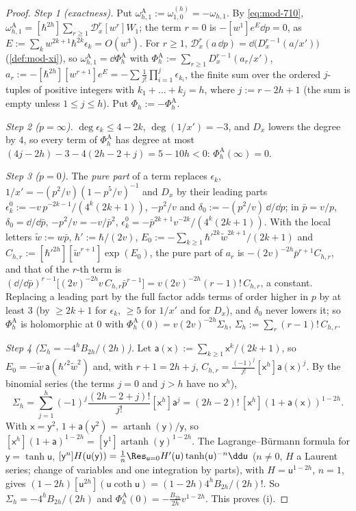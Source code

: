 \begin{proof}
\emph{Step 1 (exactness).} Put $\omega^{\mathrm A}_{h,1}:=\omega^{(h)}_{1,0}=-\omega_{h,1}$. By \eqref{eq:mod-710}, $\omega^{\mathrm A}_{h,1}=[\hbar^{2h}]\sum_{r\geq 1}\mathcal D_x^r[w^r]W_1$; the term $r=0$ is $-[w^1]e^{E}\dd p=0$, as $E:=\sum_kw^{2k+1}\hbar^{2k}\epsilon_k=O(w^3)$. For $r\geq 1$, $\mathcal D_x^r(a\,\dd p)=\dd\big(D_x^{r-1}(a/x')\big)$ (\cref{def:mod-xi}), so $\omega^{\mathrm A}_{h,1}=\dd\Phi^{\mathrm A}_h$ with $\Phi^{\mathrm A}_h:=\sum_{r\geq 1}D_x^{r-1}(a_r/x')$, $a_r:=-[\hbar^{2h}][w^{r+1}]e^{E}=-\sum\frac1{j!}\prod_{i=1}^j\epsilon_{k_i}$, the finite sum over the ordered $j$-tuples of positive integers with $k_1+\dots+k_j=h$, where $j:=r-2h+1$ (the sum is empty unless $1\leq j\leq h$). Put $\Phi_h:=-\Phi^{\mathrm A}_h$.

\emph{Step 2 ($p=\infty$).} $\deg\epsilon_k\leq 4-2k$, $\deg(1/x')=-3$, and $D_x$ lowers the degree by $4$, so every term of $\Phi^{\mathrm A}_h$ has degree at most $(4j-2h)-3-4(2h-2+j)=5-10h<0$: $\Phi^{\mathrm A}_h(\infty)=0$.

\emph{Step 3 ($p=0$).} The \emph{pure part} of a term replaces $\epsilon_k$, $1/x'=-(p^2/v)(1-p^5/v)^{-1}$ and $D_x$ by their leading parts $\epsilon^0_k:=-v\,p^{-2k-1}/(4^k(2k+1))$, $-p^2/v$ and $\delta_0:=-(p^2/v)\,\dd/\dd p$; in $\bar p=v/p$, $\delta_0=\dd/\dd\bar p$, $-p^2/v=-v/\bar p^2$, $\epsilon^0_k=-\bar p^{2k+1}v^{-2k}/(4^k(2k+1))$. With the local letters $\tilde w:=w\bar p$, $\hbar':=\hbar/(2v)$, $E_0:=-\sum_{k\geq 1}\hbar'^{2k}\tilde w^{2k+1}/(2k+1)$ and $C_{h,r}:=[\hbar'^{2h}][\tilde w^{r+1}]\exp(E_0)$, the pure part of $a_r$ is $-(2v)^{-2h}\bar p^{r+1}C_{h,r}$, and that of the $r$-th term is $(\dd/\dd\bar p)^{r-1}\big[(2v)^{-2h}v\,C_{h,r}\bar p^{r-1}\big]=v(2v)^{-2h}(r-1)!\,C_{h,r}$, a constant. Replacing a leading part by the full factor adds terms of order higher in $p$ by at least $3$ (by $\geq 2k+1$ for $\epsilon_k$, $\geq 5$ for $1/x'$ and for $D_x$), and $\delta_0$ never lowers it; so $\Phi^{\mathrm A}_h$ is holomorphic at $0$ with $\Phi^{\mathrm A}_h(0)=v(2v)^{-2h}\Sigma_h$, $\Sigma_h:=\sum_r(r-1)!\,C_{h,r}$.

\emph{Step 4 ($\Sigma_h=-4^hB_{2h}/(2h)$).} Let $\mathsf a(\mathsf x):=\sum_{k\geq 1}\mathsf x^k/(2k+1)$, so $E_0=-\tilde w\,\mathsf a(\hbar'^2\tilde w^2)$ and, with $r+1=2h+j$, $C_{h,r}=\frac{(-1)^j}{j!}[\mathsf x^h]\mathsf a(\mathsf x)^j$. By the binomial series (the terms $j=0$ and $j>h$ have no $\mathsf x^h$),
\[
\Sigma_h=\sum_{j=1}^h(-1)^j\frac{(2h-2+j)!}{j!}[\mathsf x^h]\mathsf a^j=(2h-2)!\,[\mathsf x^h](1+\mathsf a(\mathsf x))^{1-2h}.
\]
With $\mathsf x=\mathsf y^2$, $1+\mathsf a(\mathsf y^2)=\operatorname{artanh}(\mathsf y)/\mathsf y$, so $[\mathsf x^h](1+\mathsf a)^{1-2h}=[\mathsf y^{1}]\operatorname{artanh}(\mathsf y)^{1-2h}$. The Lagrange--B\"urmann formula for $\mathsf y=\tanh\mathsf u$, $[\mathsf y^n]H(\mathsf u(\mathsf y))=\frac1n\Res_{\mathsf u=0}H'(\mathsf u)\tanh(\mathsf u)^{-n}\dd\mathsf u$ ($n\neq 0$, $H$ a Laurent series; change of variables and one integration by parts), with $H=\mathsf u^{1-2h}$, $n=1$, gives $(1-2h)[\mathsf u^{2h}](\mathsf u\coth\mathsf u)=(1-2h)4^hB_{2h}/(2h)!$. So $\Sigma_h=-4^hB_{2h}/(2h)$ and $\Phi^{\mathrm A}_h(0)=-\frac{B_{2h}}{2h}v^{1-2h}$. This proves (i).


\end{proof}
